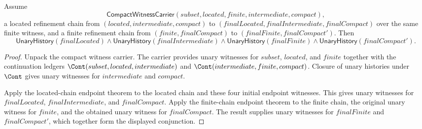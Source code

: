 \begin{theorem}
\label{thm:compact-witness-carrier-located-finite-refinement-chain-final-endpoints-unary}
Assume
$$
\mathsf{CompactWitnessCarrier}(subset,located,finite,intermediate,compact),
$$
a located refinement chain from $(located,intermediate,compact)$ to
$(finalLocated,finalIntermediate,finalCompact)$ over the same finite witness,
and a finite refinement chain from $(finite,finalCompact)$ to
$(finalFinite,finalCompact')$. Then
$$
\mathsf{UnaryHistory}(finalLocated)\land
\mathsf{UnaryHistory}(finalIntermediate)\land
\mathsf{UnaryHistory}(finalFinite)\land
\mathsf{UnaryHistory}(finalCompact').
$$
\end{theorem}
\begin{proof}
Unpack the compact witness carrier. The carrier provides unary witnesses for
$subset$, $located$, and $finite$ together with the continuation ledgers
$\Cont(subset,located,intermediate)$ and
$\Cont(intermediate,finite,compact)$. Closure of unary histories under
$\Cont$ gives unary witnesses for $intermediate$ and $compact$.

Apply the located-chain endpoint theorem to the located chain and these four
initial endpoint witnesses. This gives unary witnesses for $finalLocated$,
$finalIntermediate$, and $finalCompact$. Apply the finite-chain endpoint theorem
to the finite chain, the original unary witness for $finite$, and the obtained
unary witness for $finalCompact$. The result supplies unary witnesses for
$finalFinite$ and $finalCompact'$, which together form the displayed
conjunction.
\end{proof}

